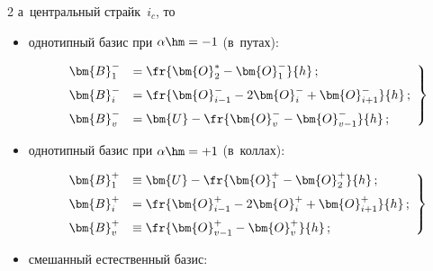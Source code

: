 \begin{multicols}{2}
а~центральный страйк~$i_c$, то 


  \begin{itemize}


\item однотипный базис при $\alpha\hm=-1$ (в~путах):


\begin{equation}


\left.


\begin{array}{rl}


\bm{B}_1^- &=\fr{\bm{O}_2^*-\bm{O}_1^-}{h}\,;\\[6pt]


  \bm{B}_i^- &= \fr{\bm{O}^-_{i-1} -2\bm{O}_i^- +\bm{O}^-_{i+1}}{h}\,;\\[6pt]


   \bm{B}^-_v &=\bm{U}- \fr{\bm{O}_v^- -\bm{O}^-_{v-1}}{h}\,;


   \end{array}


   \right\}


\label{e14-aga}


\end{equation}


\item однотипный базис при $\alpha\hm=+1$ (в~коллах):


\begin{equation}


\left.


\begin{array}{rl}


\bm{B}_1^+ &\equiv \bm{U} - \fr{\bm{O}_1^+ -\bm{O}_2^+}{h}\,;\\[6pt]


  \bm{B}_i^+ &= \fr{\bm{O}^+_{i-1} -2\bm{O}_i^+ +\bm{O}^+_{i+1}}{h}\,;\\[6pt]


    \bm{B}_v^+ &\equiv \fr{\bm{O}^+_{v-1} -\bm{O}_v^+}{h}\,;


    \end{array}


    \right\}


\label{e15-aga}


\end{equation}


\item смешанный естественный базис:


\begin{equation}


\left.



\end{equation}
\end{itemize}
\end{multicols}
